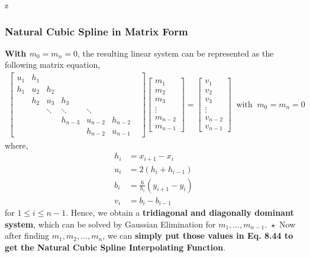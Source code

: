 z\documentclass[a4paper,12pt,twoside]{book}
\newcommand{\nll}[0]{\newline\newline}
\begin{document}
\subsubsection{Natural Cubic Spline in Matrix Form}
\textbf{With $m_0 = m_n = 0$}, the resulting linear system can be represented as the following matrix equation,
\begin{equation}
    \begin{split}
       \boxed{ \begin{bmatrix} u_1 & h_1 &  &  &  & \\
                        h_1 & u_2 & h_2 &  &  & \\
                         & h_2 & u_3 & h_3 &  & \\
                          &  & \ddots & \ddots & \ddots &  & \\
                         &  &   & h_{n-3} & u_{n-2} & h_{n-2}\\
                         &  &  &  & h_{n-2} & u_{n-1}
        \end{bmatrix} \begin{bmatrix} m_1 \\ m_2 \\m_3 \\ \vdots \\ m_{n-2}\\ m_{n-1} \end{bmatrix} = \begin{bmatrix} v_1 \\ v_2 \\v_3 \\ \vdots \\ v_{n-2}\\ v_{n-1} \end{bmatrix}  \;\;\text{with}\;\; m_0=m_n=0}
    \end{split}
\end{equation}
where,
\begin{equation}
    \begin{split}
        h_i &= x_{i+1} -x_i\\
        u_i &= 2(h_i + h_{i-1})\\
        b_i &= \frac{6}{h_i}(y_{i+1}-y_i)\\
        v_i &= b_i - b_{i-1}
    \end{split}
\end{equation}
for $1\le i\le n-1$. Hence, we obtain a \textbf{tridiagonal and diagonally dominant system}, which can be solved by Gaussian Elimination for $m_1,\dots,m_{n-1}$.
\nll
$\boxed{\star}$ Now after finding $m_1,m_2,\dots,m_n$, we can \textbf{simply put those values in Eq. 8.44 to get the Natural Cubic Spline Interpolating Function}.
\end{document}
